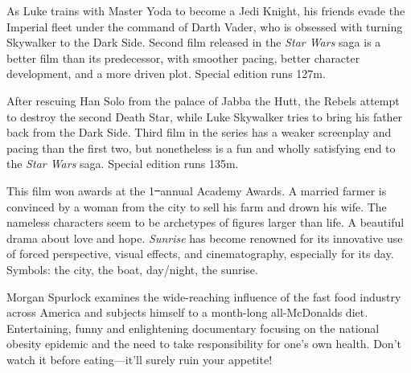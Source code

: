    As Luke trains with Master Yoda to become a Jedi Knight, his friends evade the Imperial fleet under the command of Darth Vader, who is obsessed with turning Skywalker to the Dark Side. Second film released in the \textit{Star Wars} saga is a better film than its predecessor, with smoother pacing, better character development, and a more driven plot. Special edition runs 127m. \author{DW} 

   After rescuing Han Solo from the palace of Jabba the Hutt, the Rebels attempt to destroy the second Death Star, while Luke Skywalker tries to bring his father back from the Dark Side. Third film in the series has a weaker screenplay and pacing than the first two, but nonetheless is a fun and wholly satisfying end to the \textit{Star Wars} saga. Special edition runs 135m. \author{DW} 

   This film won awards at the 1\st\ annual Academy Awards. A married farmer is convinced by a woman from the city to sell his farm and drown his wife. The nameless characters seem to be archetypes of figures larger than life. A beautiful drama about love and hope. \textit{Sunrise} has become renowned for its innovative use of forced perspective, visual effects, and cinematography, especially for its day. Symbols: the city, the boat, day/night, the sunrise. \author{AW}

   Morgan Spurlock examines the wide-reaching influence of the fast food industry across America and subjects himself to a month-long all-McDonalds diet. Entertaining, funny and enlightening documentary focusing on the national obesity epidemic and the need to take responsibility for one's own health. Don't watch it before eating---it'll surely ruin your appetite! \author{DW} 

